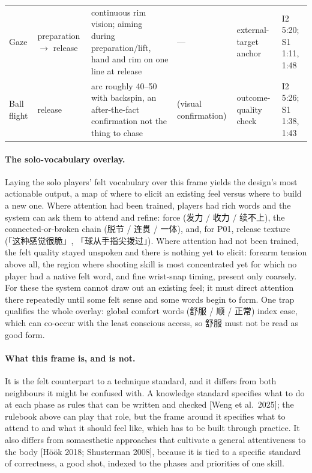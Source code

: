 \documentclass[sigconf]{acmart}
\begin{document}
\begin{table}[t]
\begin{tabular}{@{}p{1.6cm}p{1.7cm}p{5.2cm}p{2.6cm}p{2.4cm}p{2.2cm}@{}}
Gaze & preparation $\rightarrow$ release & continuous rim vision; aiming during preparation/lift, hand and rim on one line at release & --- & external-target anchor & I2 5:20; S1 1:11, 1:48 \\
Ball flight & release & arc roughly 40--50\textdegree{} with backspin, an after-the-fact confirmation not the thing to chase & (visual confirmation) & outcome-quality check & I2 5:26; S1 1:38, 1:43 \\
\bottomrule
\end{tabular}
\end{table}

\paragraph{The solo-vocabulary overlay.} Laying the solo players' felt vocabulary over this frame yields the design's most actionable output, a map of where to elicit an existing feel versus where to build a new one. Where attention had been trained, players had rich words and the system can ask them to attend and refine: force (发力 / 收力 / 续不上), the connected-or-broken chain (脱节 / 连贯 / 一体), and, for P01, release texture (「这种感觉很脆」, 「球从手指尖拨过」). Where attention had not been trained, the felt quality stayed unspoken and there is nothing yet to elicit: forearm tension above all, the region where shooting skill is most concentrated yet for which no player had a native felt word, and fine wrist-snap timing, present only coarsely. For these the system cannot draw out an existing feel; it must direct attention there repeatedly until some felt sense and some words begin to form. One trap qualifies the whole overlay: global comfort words (舒服 / 顺 / 正常) index ease, which can co-occur with the least conscious access, so 舒服 must not be read as good form.

\paragraph{What this frame is, and is not.} It is the felt counterpart to a technique standard, and it differs from both neighbours it might be confused with. A knowledge standard specifies what to do at each phase as rules that can be written and checked [Weng et al.\ 2025]; the rulebook above can play that role, but the frame around it specifies what to attend to and what it should feel like, which has to be built through practice. It also differs from somaesthetic approaches that cultivate a general attentiveness to the body [Höök 2018; Shusterman 2008], because it is tied to a specific standard of correctness, a good shot, indexed to the phases and priorities of one skill.
\end{document}
